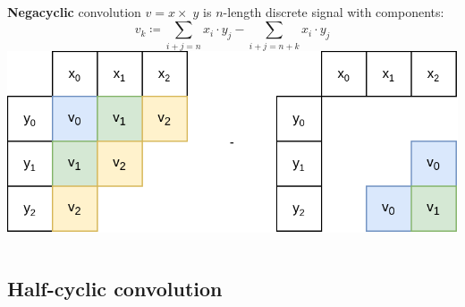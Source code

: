 \documentclass{beamer}
\begin{document}
\begin{frame}
		\frametitle{\secname}
		\framesubtitle{\subsecname}

 		\begin{columns}
				\textbf{Negacyclic} convolution $v = x \times_\_ y$ is $n$-length discrete
				signal with components:
				\[
						v_k \coloneqq \sum_{i + j = n} x_i \cdot y_j - \sum_{i + j = n + k} x_i \cdot y_j
				\]
 				\includegraphics[width=\textwidth]{../resources/negacyclic_convolution.drawio.png}
		\end{columns}
\end{frame}

\subsection{Half-cyclic convolution}
\end{document}

